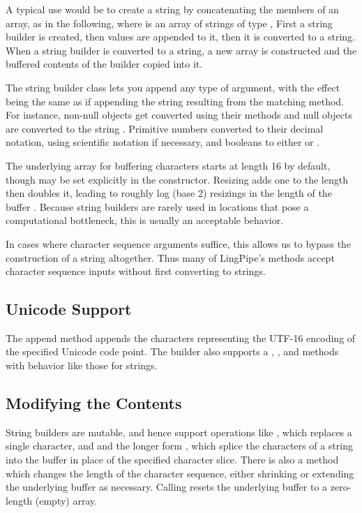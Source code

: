 A typical use would be to create a string by concatenating the members
of an array, as in the following, where  is an array of
strings of type ,
%
%
First a string builder is created, then values are appended to it,
then it is converted to a string.  When a string builder is converted
to a string, a new array is constructed and the buffered contents of
the builder copied into it.

The string builder class lets you append any type of argument, with
the effect being the same as if appending the string resulting from
the matching  method.  For instance, non-null
objects get converted using their  methods and null
objects are converted to the string .  Primitive
numbers converted to their decimal notation, using scientific notation
if necessary, and booleans to either  or
.

The underlying array for buffering characters starts at length 16 by
default, though may be set explicitly in the constructor.  Resizing
adds one to the length then doubles it, leading to roughly log (base
2) resizings in the length of the buffer .  Because string builders are rarely used in locations
that pose a computational bottleneck, this is usually an acceptable
behavior.

In cases where character sequence arguments suffice, this allows us to
bypass the construction of a string altogether.  Thus many of
LingPipe's methods accept character sequence inputs without first
converting to strings.

\subsection{Unicode Support}

The append method  appends the characters
representing the UTF-16 encoding of the specified Unicode code point.
The builder also supports a , ,
and  methods with behavior like those for strings.

\subsection{Modifying the Contents}

String builders are mutable, and hence support operations like
, which replaces a single character, and
 and the longer form
, which splice the characters of a
string into the buffer in place of the specified character slice.
There is also a  method which changes the length
of the character sequence, either shrinking or extending the underlying
buffer as necessary.  Calling  resets
the underlying buffer to a zero-length (empty) array.


